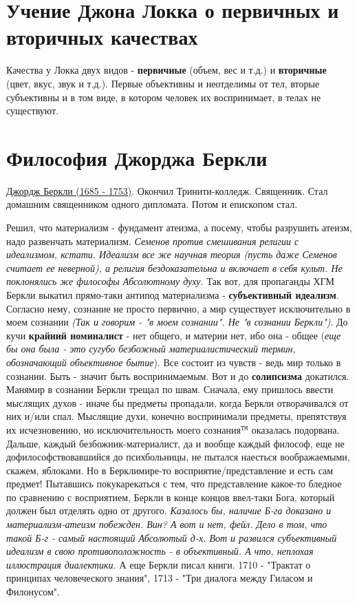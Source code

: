 \section{Учение Джона Локка о первичных и вторичных качествах}
Качества у Локка двух видов - \textbf{первичные} (объем, вес и т.д.) и \textbf{вторичные} (цвет, вкус, звук и т.д.). Первые объективны и неотделимы от тел, вторые субъективны и в том виде, в котором человек их воспринимает, в телах не существуют.
% 
\section{Философия Джорджа Беркли}
\underline{Джордж Беркли (1685 - 1753)}. Окончил Тринити-колледж. Священник. Стал домашним священником одного дипломата. Потом и епископом стал. 

Решил, что материализм - фундамент атеизма, а посему, чтобы разрушить атеизм, надо развенчать материализм. \textit{Семенов против смешивания религии с идеализмом, кстати. Идеализм  все же научная теория (пусть даже Семенов считает ее неверной), а религия бездоказательна и включает в себя культ. Не поклонялись же философы Абсолютному духу.} Так вот, для пропаганды ХГМ Беркли выкатил прямо-таки антипод материализма - \textbf{субъективный идеализм}. Согласно нему, сознание не просто первично, а мир существует исключительно в моем сознании \textit{(Так и говорим - "в моем сознании". Не "в сознании Беркли")}. До кучи \textbf{крайний номиналист} - нет общего, и материи нет, ибо она - общее (\textit{еще бы она была - это сугубо безбожный материалистический термин, обозначающий объективное бытие}). Все состоит из чувств - ведь мир только в сознании. Быть - значит быть воспринимаемым. Вот и до \textbf{солипсизма} докатился. Манямир в сознании Беркли трещал по швам. Сначала, ему пришлось ввести мыслящих духов - иначе бы предметы пропадали, когда Беркли отворачивался от них и/или спал. Мыслящие духи, конечно воспринимали предметы, препятствуя их исчезновению, но исключительность моего сознания${}^\mathtt{TM}$ оказалась подорвана. Дальше, каждый безбожник-материалист, да и вообще каждый философ, еще не дофилософствовавшийся до психбольницы, не пытался наесться воображаемыми, скажем, яблоками. Но в Берклимире-то восприятие/представление и есть сам предмет! Пытавшись покукарекаться с тем, что представление какое-то бледное по сравнению с восприятием, Беркли в конце концов ввел-таки Бога, который должен был отделять одно от другого. \textit{Казалось бы, наличие Б-га доказано и материализм-атеизм побежден. Вин? А вот и нет, фейл. Дело в том, что такой Б-г - самый настоящий Абсолютый д-х. Вот и развился субъективный идеализм в свою противоположность - в объективный. А что, неплохая иллюстрация диалектики.} А еще Беркли писал книги. 1710 - "Трактат о принципах человеческого знания",  1713 - "Три диалога между Гиласом и Филонусом".

